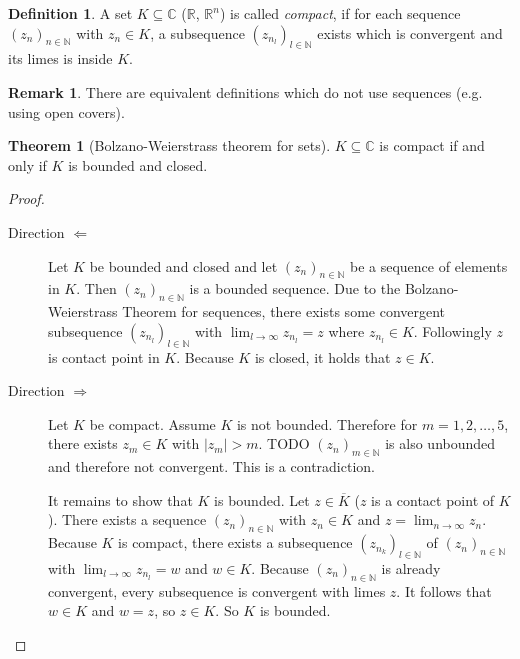\documentclass[a4paper,landscape,twocolumn]{article}
\theoremstyle{definition}
\newtheorem{theorem}{Theorem}
\newtheorem{defi}{Definition}
\newtheorem{rem}{Remark}
\newcommand\abs[1]{\left|#1\right|}
\newcommand\seq[1]{{\left(#1\right)}_{n \in \mathbb N}}
\begin{document}
\begin{defi}
  A set $K \subseteq \mathbb C$ ($\mathbb R$, $\mathbb R^n$) is called \emph{compact},
  if for each sequence $\seq{z_n}$ with $z_n \in K$,
  a subsequence $\left(z_{n_l}\right)_{l \in \mathbb N}$
  exists which is convergent and its limes is inside $K$.
\end{defi}
%
\begin{rem}
  There are equivalent definitions which do not use sequences (e.g. using open covers).
\end{rem}
%
\begin{theorem}[Bolzano-Weierstrass theorem for sets]
  $K \subseteq \mathbb C$ is compact if and only if $K$ is bounded and closed.
\end{theorem}
\begin{proof}
  \begin{description}
    \item[Direction $\Leftarrow$]
      Let $K$ be bounded and closed and let $\seq{z_n}$ be a sequence of elements
      in $K$. Then $\seq{z_n}$ is a bounded sequence. Due to the Bolzano-Weierstrass
      Theorem for sequences, there exists some convergent subsequence
      $\left(z_{n_l}\right)_{l \in \mathbb N}$ with $\lim_{l\to\infty} z_{n_l} = z$
      where $z_{n_l} \in K$. Followingly $z$ is contact point in $K$.
      Because $K$ is closed, it holds that $z \in K$.
    \item[Direction $\Rightarrow$]
      Let $K$ be compact. Assume $K$ is not bounded.
      Therefore for $m = 1, 2, \dots, 5$, there exists $z_m \in K$ with $\abs{z_m} > m$.
      TODO
      $\left(z_n\right)_{m\in\mathbb N}$ is also unbounded and therefore not convergent.
      This is a contradiction.

      It remains to show that $K$ is bounded. Let $z \in \overline{K}$ ($z$ is a contact point of $K$).
      There exists a sequence $\seq{z_n}$ with $z_n \in K$ and $z = \lim_{n\to\infty} z_n$.
      Because $K$ is compact, there exists a subsequence $\left(z_{n_k}\right)_{l\in\mathbb N}$ of
      $\seq{z_n}$ with $\lim_{l\to\infty} z_{n_l} = w$ and $w \in K$.
      Because $\seq{z_n}$ is already convergent, every subsequence is convergent
      with limes $z$.
      It follows that $w \in K$ and $w = z$, so $z \in K$. So $K$ is bounded.
  \end{description}
\end{proof}
\end{document}
